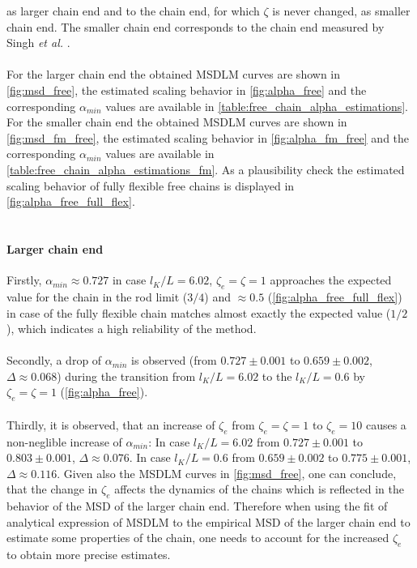 \documentclass[
    paper=A4,pagesize=automedia,fontsize=12pt,
    BCOR=15mm,DIV=22,
    twoside,headinclude,footinclude=false,
    fleqn,             %
    bibliography=totocnumbered,          %
    listof=totoc,                %
    listof=flat,                 %
    cleardoublepage=empty      %
    numbers=endperiod
]{scrartcl}
\begin{document}
as larger chain end and to the chain end, for which $\zeta$ is never changed, as 
smaller chain end. The smaller chain end corresponds to the 
chain end measured by Singh \emph{et al.} \cite{Singh:2022}.
\\
\\
For the larger chain end the obtained MSDLM curves are shown in 
\autoref{fig:msd_free}, the estimated scaling 
behavior in \autoref{fig:alpha_free} and the 
corresponding $\alpha_{min}$ values are available in 
\autoref{table:free_chain_alpha_estimations}.
For the smaller chain end the obtained MSDLM curves are shown in 
\autoref{fig:msd_fm_free}, the estimated scaling 
behavior in \autoref{fig:alpha_fm_free} and the 
corresponding $\alpha_{min}$ values are available in 
\autoref{table:free_chain_alpha_estimations_fm}.
As a plausibility check the estimated scaling behavior of fully flexible free chains is
displayed in \autoref{fig:alpha_free_full_flex}. 
\\
\\
\paragraph{Larger chain end}
Firstly, $\alpha_{min} \approx 0.727$
in case $l_K/L=6.02$, $\zeta_e=\zeta=1$ approaches the expected value for 
the chain in the rod limit ($3/4$) 
and $\approx 0.5$ (\autoref{fig:alpha_free_full_flex}) in 
case of the fully flexible chain matches almost exactly the expected value 
($1/2$), which indicates a high reliability of the method.
\\
\\
Secondly, a drop of $\alpha_{min}$ is observed 
(from $0.727\pm0.001$ to $0.659\pm0.002$, $\Delta\approx0.068$) during the
transition from $l_K/L=6.02$ to the $l_K/L=0.6$ by $\zeta_e=\zeta=1$ 
(\autoref{fig:alpha_free}).
\\
\\
Thirdly, it is observed, that an
increase of $\zeta_e$ from $\zeta_e=\zeta=1$ to $\zeta_e=10$ causes a 
non-neglible increase of $\alpha_{min}$:
In case $l_K/L=6.02$ from $0.727 \pm 0.001$ to $0.803 \pm 0.001$, $\Delta\approx0.076$.
In case $l_K/L=0.6$ from $0.659 \pm 0.002$ to $0.775 \pm 0.001$, $\Delta\approx0.116$.
Given also the MSDLM curves in \autoref{fig:msd_free}, one can conclude,
that the change in $\zeta_e$ affects the dynamics of the chains which is reflected in
the behavior of the MSD of the larger chain end. Therefore when using the fit of 
analytical expression of MSDLM
to the empirical MSD of the larger chain end to estimate some properties of the chain, 
one needs to account for the increased $\zeta_e$ to obtain more precise estimates.
\end{document}
